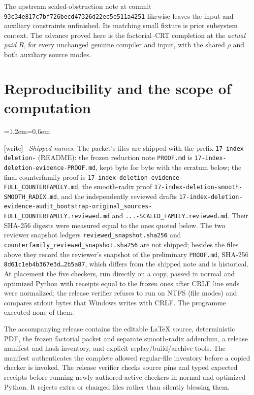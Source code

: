 \documentclass[11pt,letterpaper]{article}
\theoremstyle{definition}\newtheorem{definition}[theorem]{Definition}
\theoremstyle{remark}\newtheorem{remark}[theorem]{Remark}
\newcommand{\wtag}{\textup{[write]}}
\newenvironment{writenote}{\par\smallskip\begin{list}{}{\leftmargin=1.2em\rightmargin=0.6em}\item[]\small\wtag\ }{\end{list}\smallskip}
\newcommand{\rw}[1]{\nolinkurl{#1}}%
\begin{document}
The upstream scaled-obstruction note at commit \nolinkurl{93c34e817c7bf726becd47326d22ec5e511a4251} likewise leaves the input and auxiliary constraints unfinished. Its matching small fixture is prior subsystem context. The advance proved here is the factorial--CRT completion at the \emph{actual paid} $R$, for every unchanged genuine compiler and input, with the shared $\rho$ and both auxiliary source modes.

\section{Reproducibility and the scope of computation}\label{fup:fd:sec:repro}
\begin{writenote}
\emph{Shipped names.} The packet's files are shipped with the prefix \texttt{17-index-deletion-} (README): the frozen reduction note \rw{PROOF.md} is \rw{17-index-deletion-evidence-PROOF.md}, kept byte for byte with the erratum below; the final counterfamily proof is \rw{17-index-deletion-evidence-FULL_COUNTERFAMILY.md}, the smooth-radix proof \rw{17-index-deletion-smooth-SMOOTH_RADIX.md}, and the independently reviewed drafts \rw{17-index-deletion-evidence-audit_bootstrap-original_sources-FULL_COUNTERFAMILY.reviewed.md} and \rw{...-SCALED_FAMILY.reviewed.md}. Their SHA-256 digests were measured equal to the ones quoted below. The two reviewer snapshot ledgers \rw{reviewed_snapshot.sha256} and \rw{counterfamily_reviewed_snapshot.sha256} are not shipped; besides the files above they record the reviewer's snapshot of the preliminary \rw{PROOF.md}, SHA-256 \texttt{8d61c1eb4b367e3d\ldots2b5a87}, which differs from the shipped note and is historical. At placement the five checkers, run directly on a copy, passed in normal and optimized Python with receipts equal to the frozen ones after CRLF line ends were normalized; the release verifier refuses to run on NTFS (file modes) and compares stdout bytes that Windows writes with CRLF. The programme executed none of them.
\end{writenote}
The accompanying release contains the editable LaTeX source, deterministic PDF, the frozen factorial packet and separate smooth-radix addendum, a release manifest and hash inventory, and explicit replay/build/archive tools. The manifest authenticates the complete allowed regular-file inventory before a copied checker is invoked. The release verifier checks source pins and typed expected receipts before running newly authored active checkers in normal and optimized Python. It rejects extra or changed files rather than silently blessing them.
\end{document}
